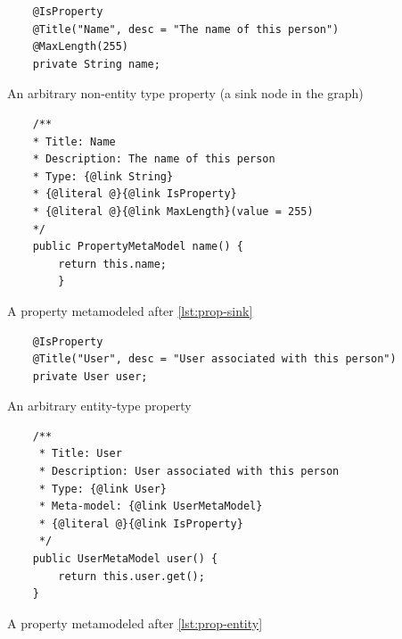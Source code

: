 \begin{listing}[H]
    \begin{verbatim}
    @IsProperty
    @Title("Name", desc = "The name of this person")
    @MaxLength(255)
    private String name;
    \end{verbatim}
    \caption{An arbitrary non-entity type property (a sink node in the graph)}
    \label{lst:prop-sink}
\end{listing}

\begin{listing}[H]
    \begin{verbatim}
    /**
    * Title: Name
    * Description: The name of this person
    * Type: {@link String}
    * {@literal @}{@link IsProperty}
    * {@literal @}{@link MaxLength}(value = 255)
    */
    public PropertyMetaModel name() {
        return this.name;
        }
    \end{verbatim}
    \caption{A property metamodeled after \ref{lst:prop-sink}}
    \label{lst:meta-prop-sink}
\end{listing}

\begin{listing}[H]
    \begin{verbatim}
    @IsProperty
    @Title("User", desc = "User associated with this person")
    private User user;
    \end{verbatim}
    \caption{An arbitrary entity-type property}
    \label{lst:prop-entity}
\end{listing}

\begin{listing}[H]
    \begin{verbatim}
    /**
     * Title: User
     * Description: User associated with this person
     * Type: {@link User}
     * Meta-model: {@link UserMetaModel}
     * {@literal @}{@link IsProperty}
     */
    public UserMetaModel user() {
        return this.user.get();
    }
    \end{verbatim}
    \caption{A property metamodeled after \ref{lst:prop-entity}}
    \label{lst:meta-prop-entity}
\end{listing}


